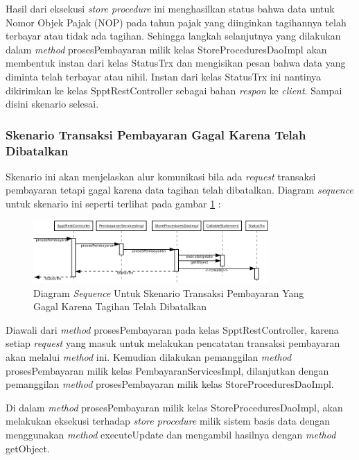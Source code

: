 \documentclass[pdftex,12pt, oneside]{article}
\begin{document}
Hasil dari eksekusi \textit{store procedure} ini menghasilkan status bahwa data untuk Nomor Objek Pajak (NOP) pada tahun pajak yang diinginkan tagihannya telah terbayar atau tidak ada tagihan. Sehingga langkah selanjutnya yang dilakukan dalam \textit{method} prosesPembayaran milik kelas StoreProceduresDaoImpl akan membentuk instan dari kelas StatusTrx dan mengisikan pesan bahwa data yang diminta telah terbayar atau nihil. Instan dari kelas StatusTrx ini nantinya dikirimkan ke kelas SpptRestController sebagai bahan \textit{respon} ke \textit{client}. Sampai disini skenario selesai.

\subsubsection{Skenario Transaksi Pembayaran Gagal Karena Telah Dibatalkan}

Skenario ini akan menjelaskan alur komunikasi bila ada \textit{request} transaksi pembayaran tetapi gagal karena data tagihan telah dibatalkan. Diagram \textit{sequence} untuk skenario ini seperti terlihat pada gambar \ref{fig:uml-seq-trx-batal} :

\begin{figure}[H]
  \centering
  \includegraphics[width=0.8\textwidth]{./resources/diagram/uml-seq-trx-batal}
  \caption{Diagram \textit{Sequence} Untuk Skenario Transaksi Pembayaran Yang Gagal Karena Tagihan Telah Dibatalkan}
  \label{fig:uml-seq-trx-batal}
\end{figure}

Diawali dari \textit{method} prosesPembayaran pada kelas SpptRestController, karena setiap \textit{request} yang masuk untuk melakukan pencatatan transaksi pembayaran akan melalui \textit{method} ini. Kemudian dilakukan pemanggilan \textit{method} prosesPembayaran milik kelas PembayaranServicesImpl, dilanjutkan dengan pemanggilan \textit{method} prosesPembayaran milik kelas StoreProceduresDaoImpl.

Di dalam \textit{method} prosesPembayaran milik kelas StoreProceduresDaoImpl, akan melakukan eksekusi terhadap \textit{store procedure} milik sistem basis data dengan menggunakan \textit{method} executeUpdate dan mengambil hasilnya dengan \textit{method} getObject. 
\end{document}
